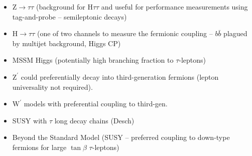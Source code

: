 \begin{itemize}
  \item $\mathrm{Z} \rightarrow \tau \tau$ (background for H$\tau \tau$ and
    useful for performance measurements using tag-and-probe -- semileptonic
    decays)

  \item $\mathrm{H} \rightarrow \tau \tau$ (one of two channels to measure
    the fermionic coupling -- $b \bar{b}$ plagued by multijet background,
    Higgs CP)

  \item MSSM Higgs (potentially high branching fraction to $\tau$-leptons)

  \item $\mathrm{Z}^\prime$ could preferentially decay into third-generation
    fermions (lepton universality not required).

  \item $\mathrm{W}^\prime$ models with preferential coupling to third-gen.

  \item SUSY with $\tau$ \textrightarrow long decay chains (Desch)

  \item Beyond the Standard Model (SUSY -- preferred coupling to down-type
    fermions for large $\tan\beta$ \textrightarrow $\tau$-leptons)
\end{itemize}

